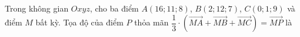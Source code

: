 \begin{ex}
Trong không gian $Oxyz$, cho ba điểm $A(16;11;8)$, $B(2;12;7)$, $C(0;1;9)$ và điểm $M$ bất kỳ. Tọa độ của điểm $P$ thỏa mãn $\dfrac13\cdot\left(\overrightarrow{MA}+\overrightarrow{MB}+\overrightarrow{MC}\right)=\overrightarrow{MP}$ là
\end{ex}
